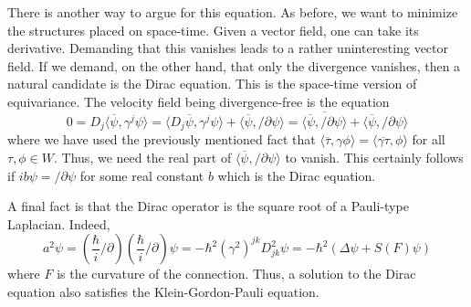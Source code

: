 \documentclass[11pt]{article}
\theoremstyle{remark}
\begin{document}
There is another way to argue for this equation.   
As before, we want to minimize the structures placed on space-time. 
Given a vector field, one can take its derivative. Demanding that this
vanishes leads to a rather uninteresting vector field. If we demand,
on the other hand, that only the divergence vanishes, then a natural
candidate is 
 the Dirac equation. This is the space-time version of
equivariance. 
The velocity field being divergence-free is the equation 
\[
0 = D_{\ensuremath{j}}\ensuremath{\langle \ensuremath{\overline{\ensuremath{\psi}}},  \gamma^{\ensuremath{j}} \ensuremath{\psi} \rangle} = \ensuremath{\langle D_{\ensuremath{j}}
  \ensuremath{\overline{\ensuremath{\psi}}},  
\gamma^{\ensuremath{j}} \ensuremath{\psi} \rangle} + \ensuremath{\langle \ensuremath{\overline{\ensuremath{\psi}}},  \ensuremath{ \slash \! \! \!} \partial
  \ensuremath{\psi} \rangle}
= \ensuremath{\overline{\ensuremath{\langle \ensuremath{\overline{\ensuremath{\psi}}}, \ensuremath{ \slash \! \! \!} \partial \ensuremath{\psi}  \rangle}}} 
+ \ensuremath{\langle \ensuremath{\overline{\ensuremath{\psi}}},  \ensuremath{ \slash \! \! \!} \partial
  \ensuremath{\psi} \rangle}
\]
where we have used the previously mentioned 
fact that $\ensuremath{\langle \ensuremath{\overline{\tau}}, {\gamma \phi} \rangle} =
\ensuremath{\langle \ensuremath{\overline{\gamma \tau}}, \phi \rangle}$ for all $\tau, \phi \in \ensuremath{W}$.
Thus, 
we need the
real part of $\ensuremath{\langle \ensuremath{\overline{\ensuremath{\psi}}},  \ensuremath{ \slash \! \! \!} \partial  \ensuremath{\psi} \rangle}$ to
vanish. This 
certainly follows if  $i b \ensuremath{\psi} = \ensuremath{ \slash \! \! \!} \partial
\ensuremath{\psi}$ for some 
real constant $b$ which is the Dirac equation. 

A final fact is  that the Dirac operator is the square root of a
Pauli-type Laplacian. Indeed, 
\[
a^2 \ensuremath{\psi} = (\frac{\hbar}{i} \ensuremath{ \slash \! \! \!} \partial) 
(\frac{\hbar}{i} \ensuremath{ \slash \! \! \!} \partial) \ensuremath{\psi} 
= - \hbar^2 (\gamma^2)^{{\ensuremath{j}}{\ensuremath{k}}} D^2_{{\ensuremath{j}}{\ensuremath{k}}} \ensuremath{\psi} 
= - \hbar^2 (\ensuremath{\Delta} \ensuremath{\psi} + \ensuremath{S}(
F) \ensuremath{\psi})
\]
where $
F$ is the curvature of the connection. 
Thus, a solution to the Dirac equation also satisfies the
Klein-Gordon-Pauli equation.

\clearpage


\end{document}
